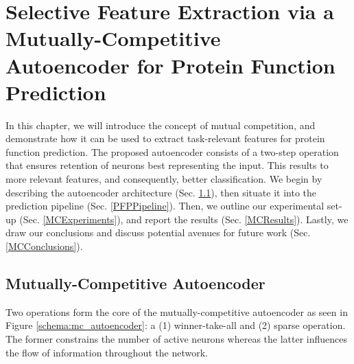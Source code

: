 %
%
%
%
%

\chapter[Selective Feature Extraction via a Mutually-Competitive Autoencoder]{
    \huge Selective Feature Extraction via a Mutually-Competitive Autoencoder
    for Protein Function Prediction
} 
\label{SelectiveChapter}

\par In this chapter, we will introduce the concept of mutual competition,
and demonstrate how it can be used to extract task-relevant features for
protein function prediction. The proposed autoencoder consists of a two-step
operation that ensures retention of neurons best representing the input. This
results to more relevant features, and consequently, better classification.
We begin by describing the autoencoder architecture (Sec.
\ref{MCArchitecture}), then situate it into the prediction pipeline (Sec.
\ref{PFPPipeline}). Then, we outline our experimental set-up (Sec.
\ref{MCExperiments}), and report the results (Sec. \ref{MCResults}). Lastly,
we draw our conclusions and discuss potential avenues for future work (Sec.
\ref{MCConclusions}).


\section{Mutually-Competitive Autoencoder}
\label{MCArchitecture}

Two operations form the core of the mutually-competitive autoencoder as seen in
Figure \ref{schema:mc_autoencoder}: a (1) winner-take-all and (2) sparse
operation. The former constrains the number of active neurons whereas the
latter influences the flow of information throughout the network.

